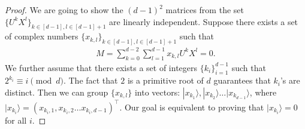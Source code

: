 \documentclass[11pt,letterpaper]{article}
\newcommand{\ket}[1]{|#1\rangle}
\newcommand{\1}{\mathbb{1}}
\theoremstyle{definition}
\begin{document}
\begin{proof}
We are going to show the $(d-1)^2$ matrices from the set $\{U^k X^l\}_{k \in[d-1], l \in [d-1]+1}$ are linearly independent.
Suppose there exists a set of complex numbers $\{ x_{k,l} \}_{k \in[d-1], l \in [d-1]+1}$
such that 
\begin{align}
	M = \sum_{k=0}^{d-2} \sum_{l=1}^{d-1} x_{k,l} U^k X^l = 0. 
\end{align}
We further assume that there exists a set of integers $\{ k_i \}_{i=1}^{d-1}$ such that $2^{k_i} \equiv i \pmod{d}$.
The fact that $2$ is a primitive root of $d$ guarantees that $k_i$'s are distinct.
Then we can group $\{x_{k,l}\}$ into vectors: $\ket{x_{k_1}}, \ket{x_{k_2}} \dots \ket{x_{k_{d-1}}}$,
where $\ket{x_{k_i}}= (x_{k_i, 1}, x_{k_i, 2} \dots x_{k_i, d-1})^\intercal$.
Our goal is equivalent to proving that $\ket{x_{k_i}} = 0$ for all $i$.


\end{proof}
\end{document}
